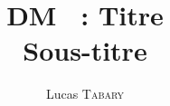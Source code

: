 \documentclass{article}
\title{DM \No 1~: Titre \\ \normalsize Sous-titre}
\author{Lucas \textsc{Tabary}}
\date{}
\begin{document}
  \maketitle{}
\end{document}
